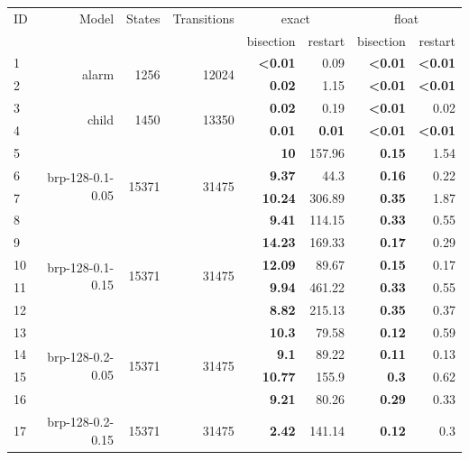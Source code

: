 \begin{longtable}{lrr@{\hskip 12pt}r@{\hskip 12pt}r@{\hskip 12pt}r@{\hskip 12pt}r@{\hskip 12pt}r}
\toprule
ID & Model & States & Transitions & \multicolumn{2}{c}{exact} & \multicolumn{2}{c}{float} \\
\cmidrule(lr){5-6}\cmidrule(lr){7-8}
 & & &  & bisection & restart & bisection & restart \\
\midrule
\endhead
1 & \multirow{2}{*}{alarm} & \multirow{2}{*}{1256} & \multirow{2}{*}{12024} & \textbf{<0.01} & 0.09 & \textbf{<0.01} & \textbf{<0.01} \\
2 &  &  &  & \textbf{0.02} & 1.15 & \textbf{<0.01} & \textbf{<0.01} \\
\cmidrule{5-8}
3 & \multirow{2}{*}{child} & \multirow{2}{*}{1450} & \multirow{2}{*}{13350} & \textbf{0.02} & 0.19 & \textbf{<0.01} & 0.02 \\
4 &  &  &  & \textbf{0.01} & \textbf{0.01} & \textbf{<0.01} & \textbf{<0.01} \\
\midrule
5 & \multirow{4}{*}{brp-128-0.1-0.05} & \multirow{4}{*}{15371} & \multirow{4}{*}{31475} & \textbf{10} & 157.96 & \textbf{0.15} & 1.54 \\
6 &  &  &  & \textbf{9.37} & 44.3 & \textbf{0.16} & 0.22 \\
7 &  &  &  & \textbf{10.24} & 306.89 & \textbf{0.35} & 1.87 \\
8 &  &  &  & \textbf{9.41} & 114.15 & \textbf{0.33} & 0.55 \\
\cmidrule{5-8}
9 & \multirow{4}{*}{brp-128-0.1-0.15} & \multirow{4}{*}{15371} & \multirow{4}{*}{31475} & \textbf{14.23} & 169.33 & \textbf{0.17} & 0.29 \\
10 &  &  &  & \textbf{12.09} & 89.67 & \textbf{0.15} & 0.17 \\
11 &  &  &  & \textbf{9.94} & 461.22 & \textbf{0.33} & 0.55 \\
12 &  &  &  & \textbf{8.82} & 215.13 & \textbf{0.35} & 0.37 \\
\cmidrule{5-8}
13 & \multirow{4}{*}{brp-128-0.2-0.05} & \multirow{4}{*}{15371} & \multirow{4}{*}{31475} & \textbf{10.3} & 79.58 & \textbf{0.12} & 0.59 \\
14 &  &  &  & \textbf{9.1} & 89.22 & \textbf{0.11} & 0.13 \\
15 &  &  &  & \textbf{10.77} & 155.9 & \textbf{0.3} & 0.62 \\
16 &  &  &  & \textbf{9.21} & 80.26 & \textbf{0.29} & 0.33 \\
\cmidrule{5-8}
17 & \multirow{4}{*}{brp-128-0.2-0.15} & \multirow{4}{*}{15371} & \multirow{4}{*}{31475} & \textbf{2.42} & 141.14 & \textbf{0.12} & 0.3 \\

\end{longtable}

